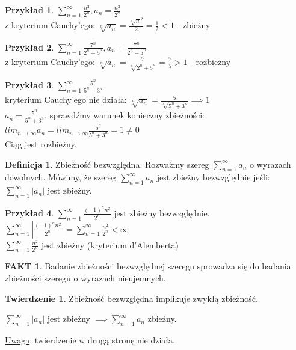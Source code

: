 \documentclass{article}
\theoremstyle{definition}
\newtheorem{de}{Definicja}[subsection]
\theoremstyle{definition}
\newtheorem{tw}{Twierdzenie}[subsection]
\theoremstyle{definition}
\newtheorem{pk}{Przykład}[subsection]
\theoremstyle{definition}
\newtheorem*{fakt}{FAKT}
\begin{document}
\begin{pk}
    $\sum_{n=1}^{\infty} \frac{n^2}{2^n}, a_n=\frac{n^2}{2^n}$\\
    z kryterium Cauchy'ego: $\sqrt[n]{a_n} = \frac{\sqrt[n]{n}^2}{2} = \frac{1}{2} < 1$ - zbieżny
\end{pk}

\begin{pk}
    $\sum_{n=1}^{\infty} \frac{7^n}{2^n+5^n}, a_n=\frac{7^n}{2^n+5^n}$\\
    z kryterium Cauchy'ego: $\sqrt[n]{a_n} = \frac{7}{\sqrt[n]{2^n+5^n}} = \frac{7}{5} > 1$ - rozbieżny
\end{pk}

\begin{pk}
    $\sum_{n=1}^{\infty} \frac{5^n}{5^n+3^n}$\\
    kryterium Cauchy'ego nie działa: $\sqrt[n]{a_n}=\frac{5}{\sqrt[n]{5^n+3^n}} \implies 1$\\
    $a_n=\frac{5^n}{5^n+3^n}$, sprawdźmy warunek konieczny zbieżności:\\
    $lim_{n\rightarrow \infty} a_n = lim_{n\rightarrow \infty} \frac{5^n}{5^n+3^n} = 1 \neq 0$\\
    Ciąg jest rozbieżny.
\end{pk}

\begin{de}
    Zbieżność bezwzględna. Rozważmy szereg $\sum_{n=1}^{\infty} a_n$ o wyrazach dowolnych. 
    Mówimy, że szereg $\sum_{n=1}^{\infty} a_n$ jest zbieżny bezwzględnie jeśli:
    $\sum_{n=1}^{\infty} |a_n|$ jest zbieżny.
\end{de}

\begin{pk}
    $\sum_{n=1}^{\infty} \frac{(-1)^n n^2}{2^n}$ jest zbieżny bezwzględnie.\\
    $\sum_{n=1}^{\infty} |\frac{(-1)^n n^2}{2^n}| = \sum_{n=1}^{\infty} \frac{n^2}{2^n} < \infty$\\
    $\sum_{n=1}^{\infty} \frac{n^2}{2^n}$ jest zbieżny (kryterium d'Alemberta)
\end{pk}

\begin{fakt}
    Badanie zbieżności bezwzględnej szeregu sprowadza się do badania zbieżności szeregu o wyrazach nieujemnych.
\end{fakt}

\begin{tw}
    Zbieżność bezwzględna implikuje zwykłą zbieżność.
    \begin{center}
        $\sum_{n=1}^{\infty} |a_n|$ jest zbieżny $\implies \sum_{n=1}^{\infty} a_n$ zbieżny.
    \end{center}
    \underline{Uwaga}: twierdzenie w drugą stronę nie działa.
\end{tw}
\end{document}
